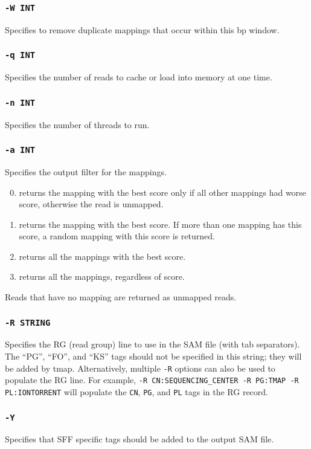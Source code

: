 \documentclass[a4paper,12pt]{book}
\newcommand{\TT}[1]{{\tt #1}} %
\begin{document}
\subsubsection{\TT{-W INT}}
Specifies to remove duplicate mappings that occur within this bp window.

\subsubsection{\TT{-q INT}}
Specifies the number of reads to cache or load into memory at one time.

\subsubsection{\TT{-n INT}}
Specifies the number of threads to run.

\subsubsection{\TT{-a INT}}
Specifies the output filter for the mappings.
\begin{enumerate}
	\setcounter{enumi}{-1} %
	\item returns the mapping with the best score only if all other mappings had worse score, otherwise the read is unmapped.
	\item returns the mapping with the best score.  
		If more than one mapping has this score, a random mapping with this score is returned.
	\item returns all the mappings with the best score.
	\item returns all the mappings, regardless of score.
\end{enumerate}
Reads that have no mapping are returned as unmapped reads.

\subsubsection{\TT{-R STRING}}
Specifies the RG (read group) line to use in the SAM file (with tab separators).
The ``PG'', ``FO'', and ``KS'' tags should not be specified in this string; they will be added by tmap.
Alternatively, multiple \TT{-R} options can also be used to populate the RG line. 
For example, \TT{-R CN:SEQUENCING\_CENTER -R PG:TMAP -R PL:IONTORRENT} will populate the \TT{CN}, \TT{PG}, and \TT{PL} tags in the RG record.

\subsubsection{\TT{-Y}}
Specifies that SFF specific tags should be added to the output SAM file.
\end{document}
